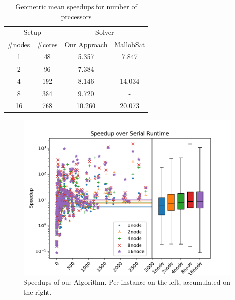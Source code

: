\documentclass[12pt,a4paper,twoside]{scrartcl}
\numberwithin{equation}{section}
\begin{document}
\begin{table}[!h]
  \center
  \begin{tabular}{ cccc }
    \toprule
    \multicolumn{2}{c}{Setup} & \multicolumn{2}{c}{Solver}\\
    \#nodes   & \#cores   & Our Approach  & MallobSat \\
    \midrule
    1  & 48  & 5.357    & 7.847\\
    2  & 96  & 7.384    & -\\
    4  & 192 & 8.146    & 14.034\\
    8  & 384 & 9.720    & -\\
    16 & 768 & 10.260   & 20.073\\
    \bottomrule
  \end{tabular}
  \caption{Geometric mean speedups for number of processors}
  \label{tab:speedups}
\end{table}

\begin{figure}[!h]
  \center
  \includegraphics[scale=.45]{plots/speedups_gim.pdf}
  \caption{Speedups of our Algorithm. Per instance on the left, accumulated on the right.}
  \label{fig:speedups}
\end{figure}

\end{document}
